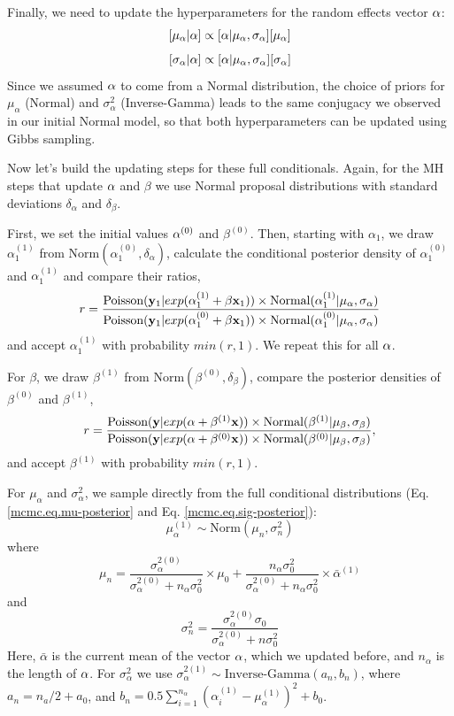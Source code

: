 Finally, we need to update the hyperparameters for the random effects
vector ${\bf \alpha}$:
\[
[\mu_{\alpha}|{\bf \alpha}] \propto [{\bf \alpha}|\mu_{\alpha}, \sigma_{\alpha}] [\mu_{\alpha}]
\]
\[
[\sigma_{\alpha}|{\bf\alpha}] \propto [{\bf \alpha}|\mu_{\alpha}, \sigma_{\alpha}] [\sigma_{\alpha}]
\]
Since we assumed ${\bf \alpha}$ to come from a Normal distribution,
the choice of priors for $\mu_{\alpha}$ (Normal) and $\sigma_{\alpha}^2$
(Inverse-Gamma) leads to the same conjugacy we observed in our initial
Normal model, so that both hyperparameters can be updated using Gibbs
sampling.

Now let's build the updating steps for these full conditionals. Again,
for the MH steps that update ${\bf \alpha}$ and $\beta$ we use Normal
proposal distributions with standard deviations $\delta_{\alpha}$ and
$\delta_{\beta}$.

First, we set the initial values ${\bf \alpha}^{(0)}$ and
$\beta^{(0)}$. Then, starting with $\alpha_1$, we draw
$\alpha_1^{(1)}$ from $\mbox{Norm}(\alpha_1^{(0)}, \delta_{\alpha})$,
calculate the conditional posterior density of $\alpha_1^{(0)}$ and
$\alpha_1^{(1)}$ and compare their ratios,
\[
r = \frac{\mbox{Poisson}({\bf y}_{1}|exp(\alpha_1^{(1)} + \beta {\bf x}_1)) \times
  \mbox{Normal}(\alpha_1^{(1)}|\mu_{\alpha}, \sigma_{\alpha})} {\mbox{Poisson}({\bf y}_{1}|exp(\alpha_1^{(0)} + \beta {\bf x}_1)) \times \mbox{Normal}(\alpha_1^{(0)}|\mu_{\alpha}, \sigma_{\alpha})}
\]
and accept $\alpha_1^{(1)}$ with probability $min(r,1)$. We repeat this for all ${\bf \alpha}$.

For $\beta$, we draw $\beta^{(1)}$ from $\mbox{Norm} (\beta^{(0)}, \delta_{\beta})$, compare the posterior densities of $\beta^{(0)}$ and $\beta^{(1)}$,
\[
r = \frac{\mbox{Poisson}({\bf y}|exp({\bf \alpha} + \beta^{(1)}{\bf x}))
  \times\mbox{Normal}(\beta^{(1)}|\mu_{\beta}, \sigma_{\beta})} { \mbox{Poisson}({\bf
    y}|exp({\bf \alpha} + \beta^{(0)}{\bf x})) \times \mbox{Normal}(\beta^{(0)}|\mu_{\beta}, \sigma_{\beta})},
\]
and accept $\beta^{(1)}$  with probability $min(r,1)$.

For $\mu_{\alpha}$ and $\sigma_{\alpha}^2$, we sample directly from the full conditional distributions (Eq. \ref{mcmc.eq.mu-posterior}  and Eq. \ref{mcmc.eq.sig-posterior}):
\[
\mu_{\alpha}^{(1)} \sim \mbox{Norm} (\mu_n, \sigma_n^2)
\]
where 
\[\mu_n =  \frac{\sigma_{\alpha}^{2(0)}}  {\sigma_{\alpha}^{2(0)}   +n_{\alpha}    \sigma_0^2} \times  \mu_0 +  \frac{n_{\alpha}  \sigma_0^2} {\sigma_{\alpha}^{2(0)}   +n_{\alpha} \sigma_0^2} \times \bar{\alpha}^{(1)}
\]
and 
\[
\sigma_n^2= \frac{\sigma_{\alpha}^{2(0)}   \sigma_0 } {\sigma_{\alpha}^{2(0)}  + n \sigma_0^2}
\]
Here, $\bar{\alpha}$ is the current mean of the vector ${\bf\alpha}$, which we
updated before, and $n_{\alpha}$ is the length of ${\bf\alpha}$. 
For $\sigma_{\alpha}^2$ we use $\sigma_{\alpha}^{2(1)}\sim \mbox{Inverse-Gamma} (a_n, b_n)$,
where  $a_n = n_a/2   + a_0$, and $b_n = 0.5  \displaystyle\sum\limits_{i=1}^{n_{\alpha}} (\alpha_i^{(1)}-\mu_{\alpha}^{(1)})^2+ b_0$.


